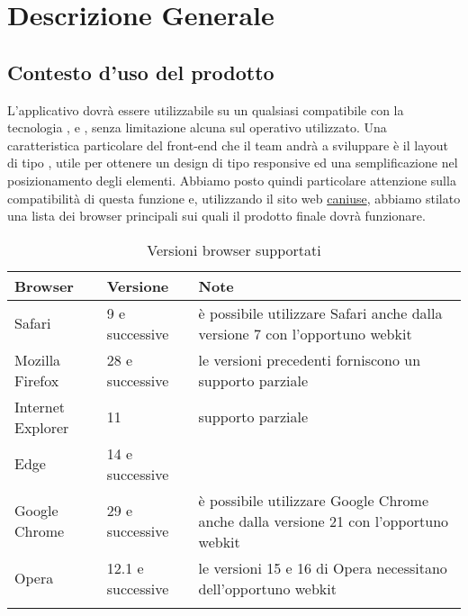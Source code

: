 \documentclass[../AnalisiDeiRequisiti.tex]{subfiles}
\begin{document}
\section{Descrizione Generale}
	\subsection{Contesto d'uso del prodotto}
	L'applicativo dovrà essere utilizzabile su un qualsiasi  compatibile con la tecnologia ,  e , senza limitazione alcuna sul  operativo utilizzato.
	Una caratteristica particolare del front-end che il team andrà a sviluppare è il layout di tipo , utile per ottenere un design di tipo responsive ed una semplificazione nel posizionamento degli elementi.
	Abbiamo posto quindi particolare attenzione sulla compatibilità di questa funzione e, utilizzando il sito web \href{http://caniuse.com/#search=flexible}{caniuse}, abbiamo stilato una lista dei browser principali sui quali il prodotto finale dovrà funzionare.
 
	\vspace{0.5cm}
	\begin{longtabu} to \textwidth {
	X[3,c,m] 
	X[3,c,m]
	X[6,c,m]}
	\toprule
	\textbf{Browser} & \textbf{Versione}  & \textbf{Note} \\
	\midrule
	\endhead
	Safari & 9 e successive & è possibile utilizzare Safari anche dalla versione 7 con l'opportuno webkit \\
	\addlinespace[0.4em]
	\midrule
	\addlinespace[0.4em]
	Mozilla Firefox & 28 e successive & le versioni precedenti forniscono un supporto parziale \\
	\addlinespace[0.4em]
	\midrule
	\addlinespace[0.4em]	
	Internet Explorer & 11 & supporto parziale \\
	\addlinespace[0.4em]
	\midrule
	\addlinespace[0.4em]
	Edge & 14 e successive &  \\
	\addlinespace[0.4em]
	\midrule
	\addlinespace[0.4em]
	Google Chrome & 29 e successive & è possibile utilizzare Google Chrome anche dalla versione 21 con l'opportuno webkit \\
	\addlinespace[0.4em]
	\midrule
	\addlinespace[0.4em]
	Opera & 12.1 e successive & le versioni 15 e 16 di Opera necessitano dell'opportuno webkit \\
	\addlinespace[0.5em]
	\bottomrule
	\caption{Versioni browser supportati}
	\label{tab:browser}
	\end{longtabu}
\end{document}
